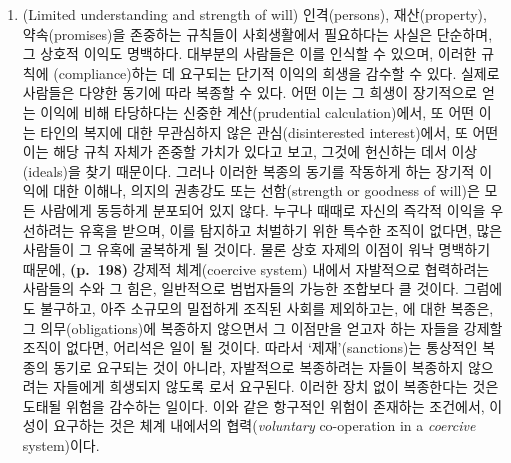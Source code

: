 \begin{enumerate}
\def\labelenumi{(\alph{enumi})}
\setcounter{enumi}{21}
\tightlist
\item
   (Limited understanding and strength of
  will) 인격(persons), 재산(property), 약속(promises)을 존중하는
  규칙들이 사회생활에서 필요하다는 사실은 단순하며, 그 상호적 이익도
  명백하다. 대부분의 사람들은 이를 인식할 수 있으며, 이러한 규칙에
  (compliance)하는 데 요구되는 단기적 이익의 희생을 감수할 수
  있다. 실제로 사람들은 다양한 동기에 따라 복종할 수 있다. 어떤 이는 그
  희생이 장기적으로 얻는 이익에 비해 타당하다는 신중한 계산(prudential
  calculation)에서, 또 어떤 이는 타인의 복지에 대한 무관심하지 않은
  관심(disinterested interest)에서, 또 어떤 이는 해당 규칙 자체가 존중할
  가치가 있다고 보고, 그것에 헌신하는 데서 이상(ideals)을 찾기 때문이다.
  그러나 이러한 복종의 동기를 작동하게 하는 장기적 이익에 대한 이해나,
  의지의 권총강도 또는 선함(strength or goodness of will)은 모든
  사람에게 동등하게 분포되어 있지 않다. 누구나 때때로 자신의 즉각적
  이익을 우선하려는 유혹을 받으며, 이를 탐지하고 처벌하기 위한 특수한
  조직이 없다면, 많은 사람들이 그 유혹에 굴복하게 될 것이다. 물론 상호
  자제의 이점이 워낙 명백하기 때문에, \textbf{(p.~198)} 강제적
  체계(coercive system) 내에서 자발적으로 협력하려는 사람들의 수와 그
  힘은, 일반적으로 범법자들의 가능한 조합보다 클 것이다. 그럼에도
  불구하고, 아주 소규모의 밀접하게 조직된 사회를 제외하고는, 에 대한 복종은, 그 의무(obligations)에
  복종하지 않으면서 그 이점만을 얻고자 하는 자들을 강제할 조직이 없다면,
  어리석은 일이 될 것이다. 따라서 `제재'(sanctions)는 통상적인 복종의
  동기로 요구되는 것이 아니라, 자발적으로 복종하려는 자들이 복종하지
  않으려는 자들에게 희생되지 않도록 로서
  요구된다. 이러한 장치 없이 복종한다는 것은 도태될 위험을 감수하는
  일이다. 이와 같은 항구적인 위험이 존재하는 조건에서, 이성이 요구하는
  것은  체계 내에서의  협력(\emph{voluntary}
  co-operation in a \emph{coercive} system)이다.
\end{enumerate}

